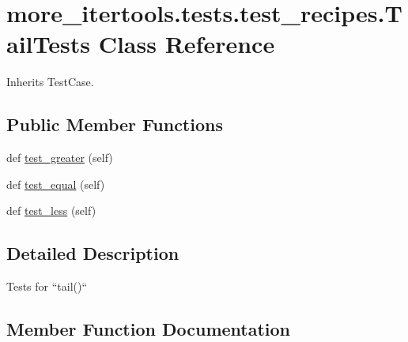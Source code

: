 \hypertarget{classmore__itertools_1_1tests_1_1test__recipes_1_1_tail_tests}{}\section{more\+\_\+itertools.\+tests.\+test\+\_\+recipes.\+Tail\+Tests Class Reference}
\label{classmore__itertools_1_1tests_1_1test__recipes_1_1_tail_tests}


Inherits Test\+Case.

\subsection*{Public Member Functions}
\begin{DoxyCompactItemize}
\item 
def \hyperlink{classmore__itertools_1_1tests_1_1test__recipes_1_1_tail_tests_aced2d228ddf3db9a9c4a522384c904d3}{test\+\_\+greater} (self)
\item 
def \hyperlink{classmore__itertools_1_1tests_1_1test__recipes_1_1_tail_tests_a0c01750c21d6a1d99b41dab12a9448e1}{test\+\_\+equal} (self)
\item 
def \hyperlink{classmore__itertools_1_1tests_1_1test__recipes_1_1_tail_tests_afdef68c0967bc4f1baa58d0e58fb8458}{test\+\_\+less} (self)
\end{DoxyCompactItemize}


\subsection{Detailed Description}
\begin{DoxyVerb}Tests for ``tail()``\end{DoxyVerb}
 

\subsection{Member Function Documentation}
\mbox{\label{classmore__itertools_1_1tests_1_1test__recipes_1_1_tail_tests_a0c01750c21d6a1d99b41dab12a9448e1}} 
